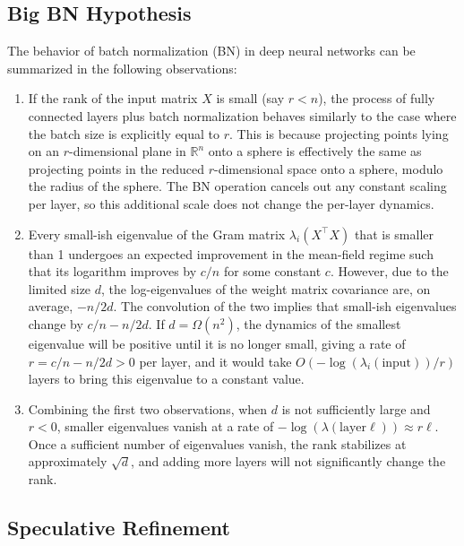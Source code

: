 \subsection{Big BN Hypothesis}

\begin{theorem}
The behavior of batch normalization (BN) in deep neural networks can be summarized in the following observations:
\begin{enumerate}
    \item If the rank of the input matrix \( X \) is small (say \( r < n \)), the process of fully connected layers plus batch normalization behaves similarly to the case where the batch size is explicitly equal to \( r \). This is because projecting points lying on an \( r \)-dimensional plane in \( \mathbb{R}^n \) onto a sphere is effectively the same as projecting points in the reduced \( r \)-dimensional space onto a sphere, modulo the radius of the sphere. The BN operation cancels out any constant scaling per layer, so this additional scale does not change the per-layer dynamics.
    \item Every small-ish eigenvalue of the Gram matrix \( \lambda_i(X^\top X) \) that is smaller than 1 undergoes an expected improvement in the mean-field regime such that its logarithm improves by \( c/n \) for some constant \( c \). However, due to the limited size \( d \), the log-eigenvalues of the weight matrix covariance are, on average, \( -n/2d \). The convolution of the two implies that small-ish eigenvalues change by \( c/n - n/2d \). If \( d = \Omega(n^2) \), the dynamics of the smallest eigenvalue will be positive until it is no longer small, giving a rate of \( r = c/n - n/2d > 0 \) per layer, and it would take \( O(-\log(\lambda_i(\text{input}))/r) \) layers to bring this eigenvalue to a constant value.
    \item Combining the first two observations, when \( d \) is not sufficiently large and \( r < 0 \), smaller eigenvalues vanish at a rate of \( -\log(\lambda(\text{layer}\ell))\approx r \ell \). Once a sufficient number of eigenvalues vanish, the rank stabilizes at approximately \( \sqrt{d} \), and adding more layers will not significantly change the rank.
\end{enumerate}
\end{theorem}

\subsection{Speculative Refinement}

